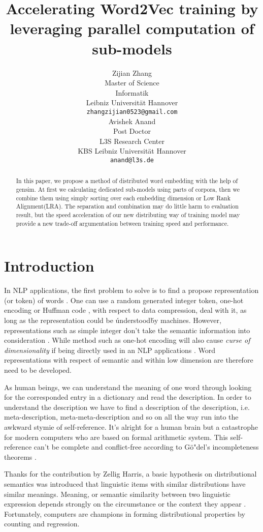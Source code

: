 \documentclass[11pt,a4paper]{article}
\title{Accelerating Word2Vec training by leveraging parallel computation of sub-models}
\author{
  Zijian Zhang \\
  Master of Science\\
  Informatik\\
  Leibniz Universit{\"a}t Hannover\\
  {\tt zhangzijian0523@gmail.com}\\ \And
  Avishek Anand\\
  Post Doctor\\
  L3S Research Center\\
  KBS Leibniz Universit{\"a}t Hannover\\
  {\tt anand@l3s.de}\\
  }
\date{}
\begin{document}
\maketitle

\begin{abstract}

    In this paper, we propose a method of distributed word embedding with the help of gensim. At first we calculating dedicated sub-models using parts of corpora, then we combine them using simply sorting over each embedding dimension or Low Rank Alignment(LRA). The separation and combination may do little harm to evaluation result, but the speed acceleration of our new distributing way of training model may provide a new trade-off argumentation between training speed and performance.
 
\end{abstract}


\section{Introduction}
In NLP applications, the first problem to solve is to find a propose representation (or token) of words \cite{schutze2008introduction}. One can use a random generated integer token, one-hot encoding \cite{turian2010word} or Huffman code \cite{el2006compression}, with respect to data compression, deal with it, as long as the representation could be \'understood\' by machines. However, representations such as simple integer don't take the semantic information into consideration \cite{le2014distributed}. While method such as one-hot encoding will also cause \textit{curse of dimensionality} if being directly used in an NLP applications \cite{bengio2003neural}. Word representations with respect of semantic and within low dimension are therefore need to be developed. 

As human beings, we can understand the meaning of one word through looking for the corresponded entry in a dictionary and read the description. In order to understand the description we have to find a description of the description, i.e. meta-description, meta-meta-description and so on all the way run into the awkward stymie of self-reference. It's alright for a human brain but a catastrophe for modern computers who are based on formal arithmetic system. This self-reference can't be complete and conflict-free according to G{\"o"}del's incompleteness theorems \cite{godel1931formal}.

Thanks for the contribution by Zellig Harris, a basic hypothesis on distributional semantics was introduced that linguistic items with similar distributions have similar meanings. Meaning, or semantic similarity between two linguistic expression depends strongly on the circumstance or the context they appear \cite{harris1954distributional}. Fortunately, computers are champions in forming distributional properties by counting and regression.
\end{document}
